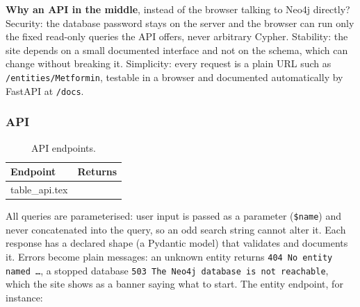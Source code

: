 \documentclass[11pt, a4paper]{article}
\makeatletter
\newcommand{\tabinput}[1]{\@@input #1 }   %
\newcommand{\code}[1]{\texttt{#1}}
\makeatother
\begin{document}
\textbf{Why an API in the middle}, instead of the browser talking to Neo4j directly? Security: the database password stays on the server and the browser can run only the fixed read-only queries the API offers, never arbitrary Cypher. Stability: the site depends on a small documented interface and not on the schema, which can change without breaking it. Simplicity: every request is a plain URL such as \code{/entities/Metformin}, testable in a browser and documented automatically by FastAPI at \code{/docs}.

\subsubsection{API}

\begin{table}[H]
\centering
\small
\caption{API endpoints.}
\label{tab:api}
\begin{tabularx}{\textwidth}{l X}
\toprule
Endpoint & Returns \\
\midrule
\tabinput{table_api.tex}
\bottomrule
\end{tabularx}
\end{table}

All queries are parameterised: user input is passed as a parameter (\code{\$name}) and never concatenated into the query, so an odd search string cannot alter it. Each response has a declared shape (a Pydantic model) that validates and documents it. Errors become plain messages: an unknown entity returns \code{404 No entity named \ldots}, a stopped database \code{503 The Neo4j database is not reachable}, which the site shows as a banner saying what to start. The entity endpoint, for instance:

\end{document}
